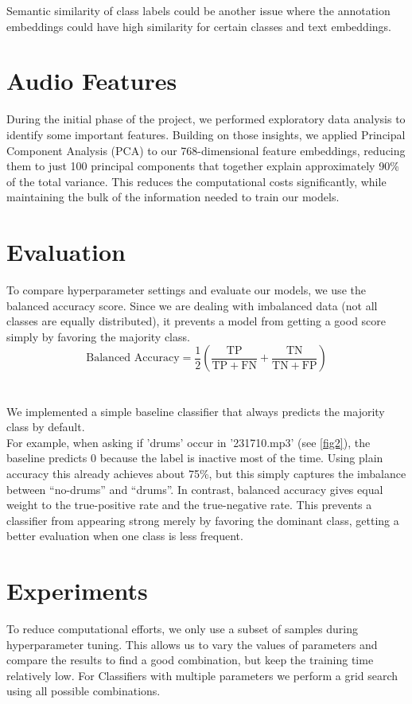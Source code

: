 \documentclass{article}
\begin{document}
Semantic similarity of class labels could be another issue where the annotation embeddings could have high similarity for certain classes and text embeddings. 



\section{Audio Features}
\label{sec:audio_features}
During the initial phase of the project, we performed exploratory data analysis to identify some important features. Building on those insights, we applied Principal Component Analysis (PCA) to our 768-dimensional feature embeddings, reducing them to just 100 principal components that together explain approximately 90\% of the total variance. This reduces the computational costs significantly, while maintaining the bulk of the information needed to train our models.

\section{Evaluation}
\label{sec:evaluation}
To compare hyperparameter settings and evaluate our models, we use the balanced accuracy score. Since we are dealing with imbalanced data (not all classes are equally distributed), it prevents a model from getting a good score simply by favoring the majority class. 
\\
$$\text{Balanced Accuracy} = \frac{1}{2} \left(\frac{\mathrm{TP}}{\mathrm{TP} + \mathrm{FN}} + \frac{\mathrm{TN}}{\mathrm{TN} + \mathrm{FP}} \right)$$
\\\\
We implemented a simple baseline classifier that always predicts the majority class by default. \\ 
For example, when asking if 'drums' occur in '231710.mp3' (see \ref{fig2}), the baseline predicts 0 because the label is inactive most of the time. Using plain accuracy this already achieves about 75\%, but this simply captures the imbalance between “no-drums” and “drums”. In contrast, balanced accuracy gives equal weight to the true-positive rate and the true-negative rate. This prevents a classifier from appearing strong merely by favoring the dominant class, getting a better evaluation when one class is less frequent.

\section{Experiments}
\label{sec:experiments}
To reduce computational efforts, we only use a subset of samples during hyperparameter tuning. This allows us to vary the values of parameters and compare the results to find a good combination, but keep the training time relatively low. For Classifiers with multiple parameters we perform a grid search using all possible combinations.
\end{document}
